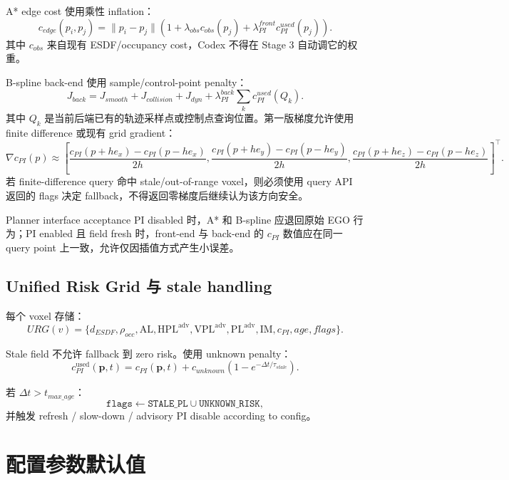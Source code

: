 \documentclass[11pt,a4paper]{article}
\newcommand{\PL}{\mathrm{PL}}
\newcommand{\AL}{\mathrm{AL}}
\newcommand{\IM}{\mathrm{IM}}
\newcommand{\HPL}{\mathrm{HPL}}
\newcommand{\VPL}{\mathrm{VPL}}
\newcommand{\pvec}{\mathbf{p}}
\newcommand{\adv}{\mathrm{adv}}
\newcommand{\used}{\mathrm{used}}
\begin{document}
A* edge cost 使用乘性 inflation：
\[
  \boxed{
  c_{edge}(p_i,p_j)
  =\|p_i-p_j\|
  \left(1+\lambda_{obs}c_{obs}(p_j)+\lambda_{PI}^{front}c_{PI}^{used}(p_j)\right).
  }
\]
其中 $c_{obs}$ 来自现有 ESDF/occupancy cost，Codex 不得在 Stage 3 自动调它的权重。

B-spline back-end 使用 sample/control-point penalty：
\[
  \boxed{
  J_{back}=J_{smooth}+J_{collision}+J_{dyn}
  +\lambda_{PI}^{back}\sum_{k} c_{PI}^{used}(Q_k).
  }
\]
其中 $Q_k$ 是当前后端已有的轨迹采样点或控制点查询位置。第一版梯度允许使用 finite difference 或现有 grid gradient：
\[
  \nabla c_{PI}(p)\approx
  \left[
  \frac{c_{PI}(p+h e_x)-c_{PI}(p-h e_x)}{2h},
  \frac{c_{PI}(p+h e_y)-c_{PI}(p-h e_y)}{2h},
  \frac{c_{PI}(p+h e_z)-c_{PI}(p-h e_z)}{2h}
  \right]^\top.
\]
若 finite-difference query 命中 stale/out-of-range voxel，则必须使用 query API 返回的 flags 决定 fallback，不得返回零梯度后继续认为该方向安全。

\begin{acceptbox}{Planner interface acceptance}
  PI disabled 时，A* 和 B-spline 应退回原始 EGO 行为；PI enabled 且 field fresh 时，front-end 与 back-end 的 $c_{PI}$ 数值应在同一 query point 上一致，允许仅因插值方式产生小误差。
\end{acceptbox}

\subsection{Unified Risk Grid 与 stale handling}

每个 voxel 存储：
\[
\boxed{
  URG(v)=\{d_{ESDF},\rho_{occ},\AL,\HPL^{\adv},\VPL^{\adv},\PL^{\adv},\IM,c_{PI},age,flags\}.
}
\]

Stale field 不允许 fallback 到 zero risk。使用 unknown penalty：
\[
\boxed{
  c_{PI}^{\used}(\pvec,t)=c_{PI}(\pvec,t)+c_{unknown}\left(1-e^{-\Delta t/\tau_{stale}}\right).
}
\]

若 $\Delta t>t_{max\_age}$：
\[
\texttt{flags}\leftarrow\texttt{STALE\_PL}\cup\texttt{UNKNOWN\_RISK},
\]
并触发 refresh / slow-down / advisory PI disable according to config。

\section{配置参数默认值}
\end{document}
